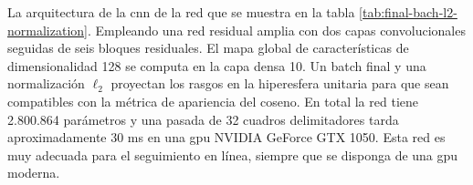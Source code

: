 La arquitectura de la \gls{cnn} de la red que se muestra en la tabla \ref{tab:final-bach-l2-normalization}. Empleando una red residual amplia con dos capas convolucionales seguidas de seis bloques residuales. El mapa global de características de dimensionalidad 128 se computa en la capa densa 10. Un batch final y una normalización $\ell_2$ proyectan los rasgos en la hiperesfera unitaria para que sean compatibles con la métrica de apariencia del coseno. En total la red tiene 2.800.864 parámetros y una pasada de 32 cuadros delimitadores tarda aproximadamente 30 ms en una \gls{gpu} NVIDIA GeForce GTX 1050. Esta red es muy adecuada para el seguimiento en línea, siempre que se disponga de una \gls{gpu} moderna.
